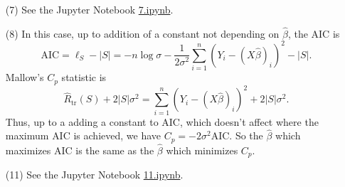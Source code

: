 \documentclass[10pt]{article}
\begin{document}
\begin{enumerate}
\item[(7)]
See the Jupyter Notebook
\href{https://github.com/ajrasmus/some_of_statistics/blob/main/chapter_13/7.ipynb}{7.ipynb}.

\item[(8)]
In this case, up to addition of a constant not depending on $\hat \beta$,
the AIC is
\[
\text{AIC} = \ell_S - |S| = -n\log \sigma - \frac{1}{2\sigma^2}\sum_{i=1}^n
(Y_i - (X \hat \beta)_i)^2 - |S|.
\]
Mallow's $C_p$ statistic is
\[
\hat R_{\text{tr}}(S) + 2 |S| \sigma^2 = \sum_{i=1}^n (Y_i - (X \hat \beta)_i)^2 +
2 |S|\sigma^2.
\]
Thus, up to a adding a constant to $\text{AIC}$, which doesn't affect where the maximum
$\text{AIC}$ is achieved, we have $C_p = - 2\sigma^2 \text{AIC}$. So the $\hat \beta$
which maximizes $\text{AIC}$ is the same as the $\hat \beta$ which minimizes $C_p$.

\item[(11)]
See the Jupyter Notebook
\href{https://github.com/ajrasmus/some_of_statistics/blob/main/chapter_13/11.ipynb}{11.ipynb}.

\end{enumerate}
\end{document}
